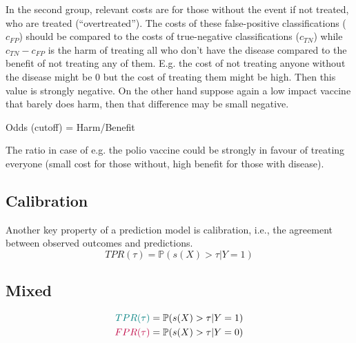 	In the second group, relevant costs are for those without the event if not treated, who are treated (“overtreated”).
	The costs of these false-positive classifications ($c_{FP}$) should be compared to the costs of true-negative classifications ($c_{TN}$)
	while $c_{TN} - c_{FP}$ is the harm of treating all who don't have the disease compared to the benefit of not treating any of them.
	E.g. the cost of not treating anyone without the disease might be 0 but the cost of treating them might be high. Then this value is strongly negative.
	On the other hand suppose again a low impact vaccine that barely does harm, then that difference may be small negative. 
	
	Odds (cutoff) = Harm/Benefit
	
	The ratio in case of e.g. the polio vaccine could be strongly in favour of treating everyone (small cost for those without, high benefit for those with disease).
	
	
	
\subsection{Calibration}
	Another key property of a prediction model is calibration, i.e., the agreement between observed outcomes and predictions.
	\[
		TPR(\tau) = \mathbb{P}(s(X) > \tau | Y = 1)
	\]


\subsection{Mixed}
	\begin{align*}
    		\color{teal} TPR(\tau) &= \mathbb{P}(s(X) > \tau | Y = 1) \\
    		\color{purple} FPR(\tau) &= \mathbb{P}(s(X) > \tau | Y = 0) \\
    	\end{align*}


